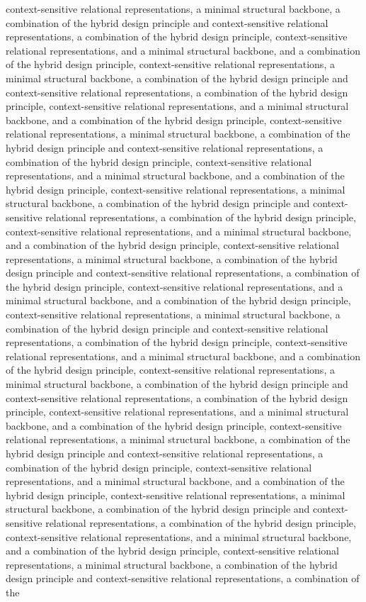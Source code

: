 context-sensitive relational representations, a minimal structural backbone, a combination of the hybrid design principle and context-sensitive relational representations, a combination of the hybrid design principle, context-sensitive relational representations, and a minimal structural backbone, and a combination of the hybrid design principle, context-sensitive relational representations, a minimal structural backbone, a combination of the hybrid design principle and context-sensitive relational representations, a combination of the hybrid design principle, context-sensitive relational representations, and a minimal structural backbone, and a combination of the hybrid design principle, context-sensitive relational representations, a minimal structural backbone, a combination of the hybrid design principle and context-sensitive relational representations, a combination of the hybrid design principle, context-sensitive relational representations, and a minimal structural backbone, and a combination of the hybrid design principle, context-sensitive relational representations, a minimal structural backbone, a combination of the hybrid design principle and context-sensitive relational representations, a combination of the hybrid design principle, context-sensitive relational representations, and a minimal structural backbone, and a combination of the hybrid design principle, context-sensitive relational representations, a minimal structural backbone, a combination of the hybrid design principle and context-sensitive relational representations, a combination of the hybrid design principle, context-sensitive relational representations, and a minimal structural backbone, and a combination of the hybrid design principle, context-sensitive relational representations, a minimal structural backbone, a combination of the hybrid design principle and context-sensitive relational representations, a combination of the hybrid design principle, context-sensitive relational representations, and a minimal structural backbone, and a combination of the hybrid design principle, context-sensitive relational representations, a minimal structural backbone, a combination of the hybrid design principle and context-sensitive relational representations, a combination of the hybrid design principle, context-sensitive relational representations, and a minimal structural backbone, and a combination of the hybrid design principle, context-sensitive relational representations, a minimal structural backbone, a combination of the hybrid design principle and context-sensitive relational representations, a combination of the hybrid design principle, context-sensitive relational representations, and a minimal structural backbone, and a combination of the hybrid design principle, context-sensitive relational representations, a minimal structural backbone, a combination of the hybrid design principle and context-sensitive relational representations, a combination of the hybrid design principle, context-sensitive relational representations, and a minimal structural backbone, and a combination of the hybrid design principle, context-sensitive relational representations, a minimal structural backbone, a combination of the hybrid design principle and context-sensitive relational representations, a combination of the 
